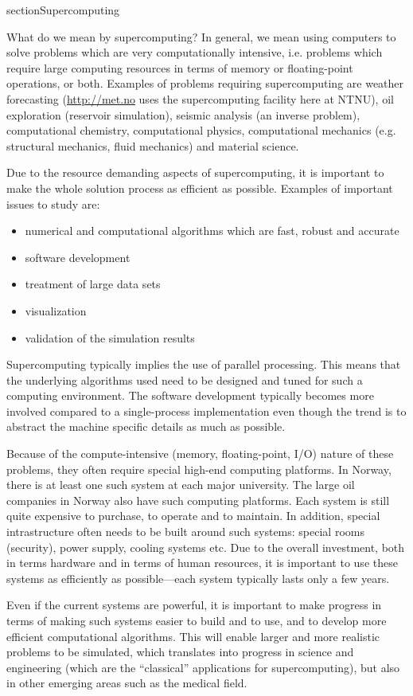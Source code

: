 section{Supercomputing}

What do we mean by supercomputing? In general, we mean using computers to solve
problems which are very computationally intensive, i.e. problems which require
large computing resources in terms of memory or floating-point operations, or
both. Examples of problems requiring supercomputing are weather forecasting
(\url{http://met.no} uses the supercomputing facility here at NTNU), oil
exploration (reservoir simulation), seismic analysis (an inverse problem),
computational chemistry, computational physics, computational mechanics (e.g.
structural mechanics, fluid mechanics) and material science.

Due to the resource demanding aspects of supercomputing, it is important to make
the whole solution process as efficient as possible. Examples of important
issues to study are:
\begin{itemize}
\item numerical and computational algorithms which are fast, robust and accurate
\item software development
\item treatment of large data sets
\item visualization
\item validation of the simulation results
\end{itemize}
Supercomputing typically implies the use of parallel processing. This means that
the underlying algorithms used need to be designed and tuned for such a
computing environment. The software development typically becomes more involved
compared to a single-process implementation even though the trend is to abstract
the machine specific details as much as possible.

Because of the compute-intensive (memory, floating-point, I/O) nature of these
problems, they often require special high-end computing platforms. In Norway,
there is at least one such system at each major university. The large oil
companies in Norway also have such computing platforms. Each system is still
quite expensive to purchase, to operate and to maintain. In addition, special
intrastructure often needs to be built around such systems: special rooms
(security), power supply, cooling systems etc. Due to the overall investment,
both in terms hardware and in terms of human resources, it is important to use
these systems as efficiently as possible---each system typically lasts only a
few years.

Even if the current systems are powerful, it is important to make progress in
terms of making such systems easier to build and to use, and to develop more
efficient computational algorithms. This will enable larger and more realistic
problems to be simulated, which translates into progress in science and
engineering (which are the ``classical'' applications for supercomputing), but
also in other emerging areas such as the medical field.

